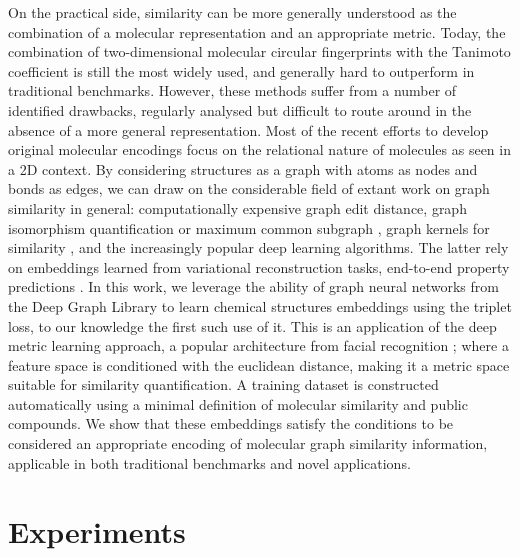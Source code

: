 \documentclass[doublespacing]{bmcart}
\begin{document}
On the practical side, similarity can be more generally understood as the combination of a molecular representation and an appropriate metric\cite{maggiora2014molecular}. Today, the combination of two-dimensional molecular circular fingerprints \cite{cereto2015molecular, rogers2010extended} with the Tanimoto coefficient \cite{bajusz2015tanimoto} is still the most widely used, and  generally hard to outperform in traditional benchmarks\cite{raymond2002effectiveness}. However, these methods suffer from a number of identified drawbacks, regularly analysed but difficult to route around in the absence of a more general representation\cite{flower1998properties, dixon1999hidden}. Most of the recent efforts to develop original molecular encodings focus on the relational nature of molecules as seen in a 2D context. By considering structures as a graph with atoms as nodes and bonds as edges, we can draw on the considerable field of extant work on graph similarity in general: computationally expensive graph edit distance, graph isomorphism quantification or maximum common subgraph \cite{garcia2019ligand, bunke1998graph, bunke1983inexact, dijkman2009graph, berretti2001efficient}, graph kernels for similarity \cite{kriege2020survey}, and the increasingly popular deep learning algorithms\cite{ma2021deep}. The latter rely on embeddings learned from variational reconstruction tasks\cite{jin2018junction}, end-to-end property predictions \cite{brown2009chemoinformatics}. In this work, we leverage  the ability of graph neural networks from the Deep Graph Library\cite{wang2019deep, li2021dgl} to learn chemical structures embeddings using the triplet loss\cite{schultz2004learning}, to our knowledge the first such use of it. 
This is an application of the deep metric learning approach, a popular architecture from facial recognition \cite{bai2019simgnn}; where a feature space is conditioned with the euclidean distance, making it a metric space suitable for similarity quantification. A training dataset is constructed automatically using a minimal definition of molecular similarity and public compounds. We show that these embeddings satisfy the conditions to be considered an appropriate encoding of molecular graph similarity information, applicable in both traditional benchmarks and novel applications.


\section*{Experiments}
\end{document}
